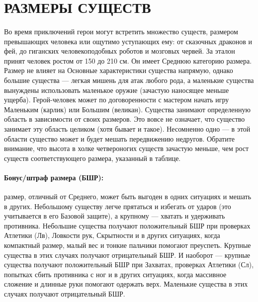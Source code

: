 \section{РАЗМЕРЫ СУЩЕСТВ}
\paragraph{}
Во время приключений герои могут встретить множество существ, размером превышающих человека или ощутимо уступающих ему: от сказочных драконов и фей, до гиганских человекоподобных роботов и мозговых червей. За эталон принят человек ростом от 150 до 210 см. Он имеет Среднюю категорию размера. Размер не влияет на Основные характеристики существа напрямую, однако большие существа — легкая мишень для атак любого рода, а маленькие существа вынуждены использовать маленькое оружие (зачастую наносящее меньше ущерба). Герой-человек может по договоренности с мастером начать игру Маленьким (карлик) или Большим (великан).
\newline
Существа занимают определенную область в зависимости от своих размеров. Это вовсе не означает, что существо занимает эту область целиком (хотя бывает и такое). Несомненно одно — в этой области существо может и будет мешать передвижению недругов. Обратите внимание, что высота в холке четвероногих существ зачастую меньше, чем рост существ соответствующего размера, указанный в таблице.
\paragraph{Бонус/штраф размера (БШР):} размер, отличный от Среднего, может быть выгоден в одних ситуациях и мешать в других. Небольшому существу легче прятаться и избегать от ударов (это учитывается в его Базовой защите), а крупному — хватать и удерживать противника.
\newline
Небольшие существа получают положительный БШР при проверках Атлетики (Лв), Ловкости рук, Скрытности и в других ситуациях, когда компактный размер, малый вес и тонкие пальчики помогают преуспеть. Крупные существа в этих случаях получают отрицательный БШР.
\newline
И наоборот — крупные существа получают положительный БШР при Захватах, проверках Атлетики (Сл), попытках сбить противника с ног и в других ситуациях, когда массивное сложение и длинные руки помогают одержать верх. Маленькие существа в этих случаях получают отрицательный БШР.
